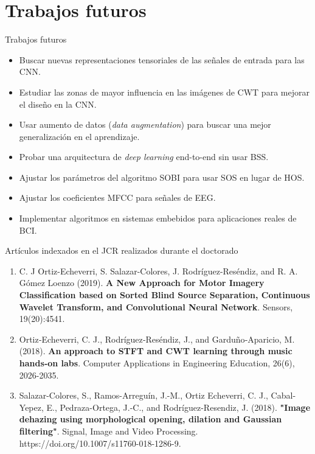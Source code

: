 \documentclass[10pt]{beamer}
\begin{document}
\section{Trabajos futuros}

\begin{frame}{Trabajos futuros}

\begin{itemize}
    
    \item Buscar nuevas representaciones tensoriales de las señales de entrada para las CNN.
    \item Estudiar las zonas de mayor influencia en las imágenes de CWT para mejorar el diseño en la CNN.
    \item Usar aumento de datos (\textit{data augmentation}) para buscar una mejor generalización en el aprendizaje. 
    \item Probar una arquitectura de \textit{deep learning} end-to-end sin usar BSS.
    \item Ajustar los parámetros del algoritmo SOBI para usar SOS en lugar de HOS.
    \item Ajustar los coeficientes MFCC para señales de EEG.
    \item Implementar algoritmos en sistemas embebidos para aplicaciones reales de BCI.
\end{itemize}
    
\end{frame}

\begin{frame}{Artículos indexados en el JCR realizados durante el doctorado}

\begin{enumerate}

\item C. J Ortiz-Echeverri, S. Salazar-Colores, J. Rodríguez-Reséndiz, and R. A. Gómez Loenzo (2019). \textbf{A New Approach for Motor Imagery Classification based on Sorted Blind Source Separation, Continuous Wavelet Transform, and Convolutional Neural
Network}. Sensors, 19(20):4541.


\item Ortiz‐Echeverri, C. J., Rodríguez‐Reséndiz, J., and Garduño‐Aparicio, M. (2018). \textbf{An approach to STFT and CWT learning through music hands‐on labs}. Computer Applications in Engineering Education, 26(6), 2026-2035.

 \item  Salazar-Colores, S., Ramos-Arreguín, J.-M., Ortiz Echeverri, C. J., Cabal-Yepez, E., Pedraza-Ortega, J.-C., and Rodríguez-Resendiz, J. (2018). \textbf{"Image dehazing using morphological opening, dilation and Gaussian filtering"}. Signal, Image and Video Processing. https://doi.org/10.1007/s11760-018-1286-9.
 
 \end{enumerate}
    
\end{frame}
\end{document}
